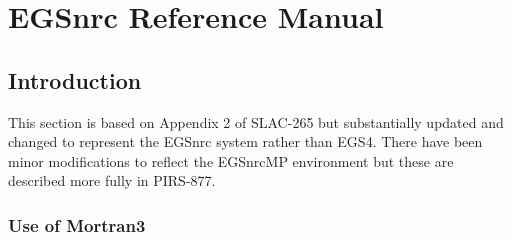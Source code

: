 
%
%
%
%
%
%
%
%
%


\newpage

\section{EGSnrc Reference Manual}
\label{ERM}

\subsection{Introduction}

This section is based on Appendix 2 of SLAC-265\cite{Ne85} but
substantially updated and changed to represent the EGSnrc system rather
than EGS4. There have been minor modifications to reflect the EGSnrcMP
environment but these are described more fully in PIRS-877\cite{Ka03}.

\subsubsection{Use of Mortran3}

